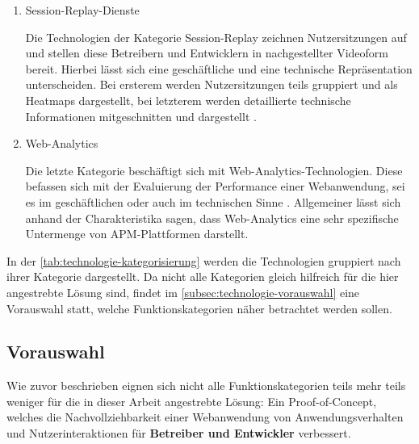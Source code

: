 \begin{enumerate}
	\item Session-Replay-Dienste
	\par Die Technologien der Kategorie Session-Replay zeichnen Nutzersitzungen auf und stellen diese Betreibern und Entwicklern in nachgestellter Videoform bereit. Hierbei lässt sich eine geschäftliche und eine technische Repräsentation unterscheiden. Bei ersterem werden Nutzersitzungen teils gruppiert und als Heatmaps dargestellt, bei letzterem werden detaillierte technische Informationen mitgeschnitten und dargestellt \cite{Webalyt}.
	
	\item Web-Analytics
	\par Die letzte Kategorie beschäftigt sich mit Web-Analytics-Technologien. Diese befassen sich mit der Evaluierung der Performance einer Webanwendung, sei es im geschäftlichen oder auch im technischen Sinne \cite{APracticalEvaluationOfWebAnalytics} \cite{WebAnalyticsAnHourADay}. Allgemeiner lässt sich anhand der Charakteristika sagen, dass Web-Analytics eine sehr spezifische Untermenge von APM-Plattformen darstellt.
	
\end{enumerate}

In der \autoref{tab:technologie-kategorisierung} werden die Technologien gruppiert nach ihrer Kategorie dargestellt. Da nicht alle Kategorien gleich hilfreich für die hier angestrebte Lösung sind, findet im \autoref{subsec:technologie-vorauswahl} eine Vorauswahl statt, welche Funktionskategorien näher betrachtet werden sollen.



\subsection{Vorauswahl}
\label{subsec:technologie-vorauswahl}

Wie zuvor beschrieben eignen sich nicht alle Funktionskategorien teils mehr teils weniger für die in dieser Arbeit angestrebte Lösung: Ein Proof-of-Concept, welches die Nachvollziehbarkeit einer Webanwendung von Anwendungsverhalten und Nutzerinteraktionen für \textbf{Betreiber und Entwickler} verbessert.

